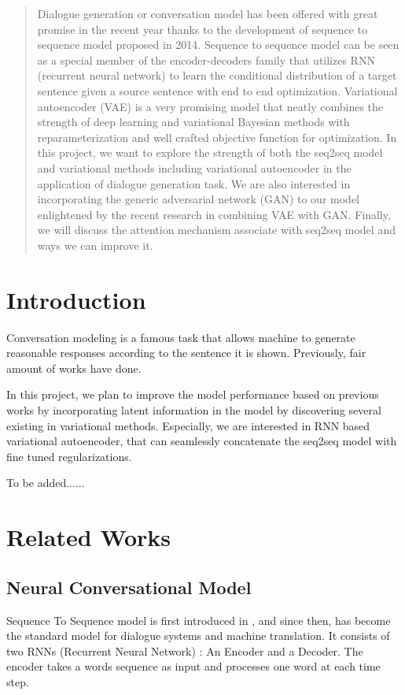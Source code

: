\documentclass{article}
\begin{document}
\begin{abstract} 
Dialogue generation or conversation model has been offered with great promise in the recent year thanks to the development of sequence to sequence model proposed in 2014. Sequence to sequence model can be seen as a special member of the encoder-decoders family that utilizes RNN (recurrent neural network) to learn the conditional distribution of a target sentence given a source sentence with end to end optimization. Variational autoencoder (VAE) is a very promising model that neatly combines the strength of deep learning and variational Bayesian methods with reparameterization and well crafted objective function for optimization. In this project, we want to explore the strength of both the seq2seq model and variational methods including variational autoencoder in the application of dialogue generation task. We are also interested in incorporating the generic adversarial network (GAN) to our model enlightened by the recent research in combining VAE with GAN. Finally, we will discuss the attention mechanism associate with seq2seq model and ways we can improve it.
\end{abstract} 

\section{Introduction}
Conversation modeling is a famous task that allows machine to generate reasonable responses according to the sentence it is shown. Previously, fair amount of works have done.

In this project, we plan to improve the model performance based on previous works by incorporating latent information in the model by discovering several existing in variational methods. Especially, we are interested in RNN based variational autoencoder, that can seamlessly concatenate the seq2seq model with fine tuned regularizations.

To be added......



\section{Related Works}

\subsection{Neural Conversational Model}

Sequence To Sequence model is first introduced in \cite{seq2seq}, and since then, has become the standard model for dialogue systems \cite{ncm} and machine translation. It consists of two RNNs (Recurrent Neural Network) : An Encoder and a Decoder. The encoder takes a words sequence as input and processes one word at each time step. 
\end{document}
